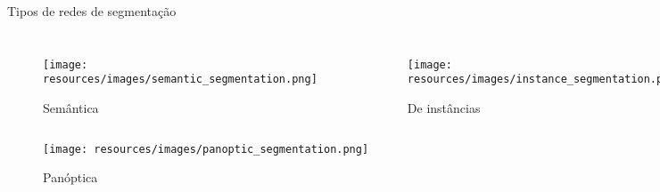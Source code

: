 \begin{frame}{Tipos de redes de segmentação}

    \begin{columns}

        \begin{figure}[h]
            \centering
            \texttt{[image: resources/images/semantic\_segmentation.png]}
            \captionsetup{labelformat=empty}
            \caption{Semântica}
        \end{figure}

        \begin{figure}[h]
            \centering
            \texttt{[image: resources/images/instance\_segmentation.png]}
            \captionsetup{labelformat=empty}
            \caption{De instâncias}
        \end{figure}
    \end{columns}
        \vspace{\fill}
        \vspace{-0.2cm}



        \begin{figure}[h]
            \centering
            \texttt{[image: resources/images/panoptic\_segmentation.png]}
            \captionsetup{labelformat=empty}
            \caption{Panóptica}
        \end{figure}

\end{frame}
